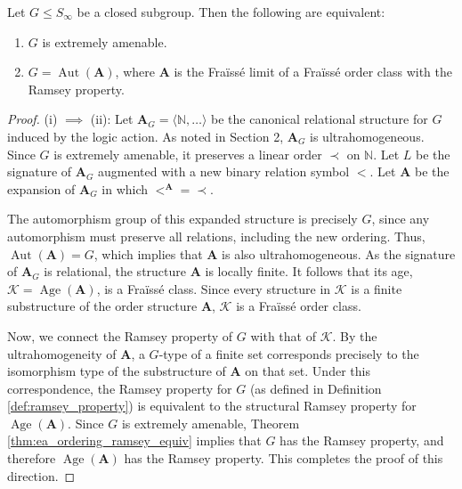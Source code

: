 \begin{theorem}
    \label{thm:main_characterization}
    Let $G \le S_\infty$ be a closed subgroup. Then the following are equivalent:
    \begin{enumerate}
        \item[(i)] $G$ is extremely amenable.
        \item[(ii)] $G = \operatorname{Aut}(\mathbf{A})$, where $\mathbf{A}$ is the Fraïssé limit of a Fraïssé order class with the Ramsey property.
    \end{enumerate}
\end{theorem}

\begin{proof}
    (i) $\implies$ (ii): Let $\mathbf{A}_G = \langle \mathbb{N}, \dots \rangle$ be the canonical relational structure for $G$ induced by the logic action. As noted in Section 2, $\mathbf{A}_G$ is ultrahomogeneous. Since $G$ is extremely amenable, it preserves a linear order $\prec$ on $\mathbb{N}$. Let $L$ be the signature of $\mathbf{A}_G$ augmented with a new binary relation symbol $<$. Let $\mathbf{A}$ be the expansion of $\mathbf{A}_G$ in which $<^\mathbf{A} = \prec$.

    The automorphism group of this expanded structure is precisely $G$, since any automorphism must preserve all relations, including the new ordering. Thus, $\operatorname{Aut}(\mathbf{A}) = G$, which implies that $\mathbf{A}$ is also ultrahomogeneous. As the signature of $\mathbf{A}_G$ is relational, the structure $\mathbf{A}$ is locally finite. It follows that its age, $\mathcal{K} = \operatorname{Age}(\mathbf{A})$, is a Fraïssé class. Since every structure in $\mathcal{K}$ is a finite substructure of the order structure $\mathbf{A}$, $\mathcal{K}$ is a Fraïssé order class.

    Now, we connect the Ramsey property of $G$ with that of $\mathcal{K}$. By the ultrahomogeneity of $\mathbf{A}$, a $G$-type of a finite set corresponds precisely to the isomorphism type of the substructure of $\mathbf{A}$ on that set. Under this correspondence, the Ramsey property for $G$ (as defined in Definition \ref{def:ramsey_property}) is equivalent to the structural Ramsey property for $\operatorname{Age}(\mathbf{A})$. Since $G$ is extremely amenable, Theorem \ref{thm:ea_ordering_ramsey_equiv} implies that $G$ has the Ramsey property, and therefore $\operatorname{Age}(\mathbf{A})$ has the Ramsey property. This completes the proof of this direction.

    \medskip


\end{proof}
